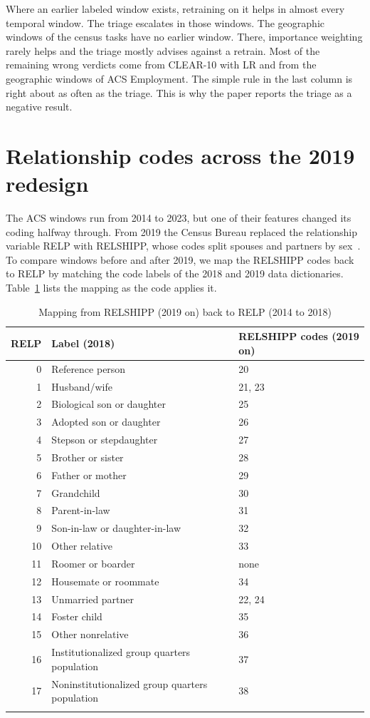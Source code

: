 \documentclass[pdflatex,sn-basic]{sn-jnl}
\begin{document}
Where an earlier labeled window exists, retraining on it helps in almost every temporal window. The triage escalates in those windows. The geographic windows of the census tasks have no earlier window. There, importance weighting rarely helps and the triage mostly advises against a retrain. Most of the remaining wrong verdicts come from CLEAR-10 with LR and from the geographic windows of ACS Employment. The simple rule in the last column is right about as often as the triage. This is why the paper reports the triage as a negative result.

\section{Relationship codes across the 2019 redesign}\label{sec:relp}

The ACS windows run from 2014 to 2023, but one of their features changed its coding halfway through. From 2019 the Census Bureau replaced the relationship variable RELP with RELSHIPP, whose codes split spouses and partners by sex~\citep{census2019pums}. To compare windows before and after 2019, we map the RELSHIPP codes back to RELP by matching the code labels of the 2018 and 2019 data dictionaries. Table~\ref{tab:relp} lists the mapping as the code applies it.

\begin{table}[!htbp]\centering\tablebodyfont
\caption{Mapping from RELSHIPP (2019 on) back to RELP (2014 to 2018)}\label{tab:relp}%
\begin{tabular}{@{}rll@{}}
\toprule
RELP & Label (2018) & RELSHIPP codes (2019 on) \\
\midrule
0 & Reference person & 20 \\
1 & Husband/wife & 21, 23 \\
2 & Biological son or daughter & 25 \\
3 & Adopted son or daughter & 26 \\
4 & Stepson or stepdaughter & 27 \\
5 & Brother or sister & 28 \\
6 & Father or mother & 29 \\
7 & Grandchild & 30 \\
8 & Parent-in-law & 31 \\
9 & Son-in-law or daughter-in-law & 32 \\
10 & Other relative & 33 \\
11 & Roomer or boarder & none \\
12 & Housemate or roommate & 34 \\
13 & Unmarried partner & 22, 24 \\
14 & Foster child & 35 \\
15 & Other nonrelative & 36 \\
16 & Institutionalized group quarters population & 37 \\
17 & Noninstitutionalized group quarters population & 38 \\
\botrule
\end{tabular}
\end{table}
\end{document}
